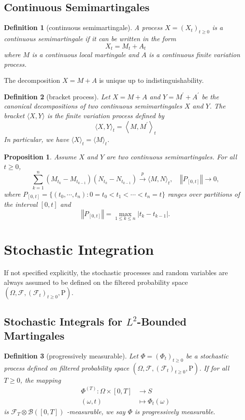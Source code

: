 \documentclass{article}
\newtheorem{definition}{Definition}[section]
\newtheorem{proposition}{Proposition}[section]
\theoremstyle{nonumberplain}
\begin{document}
\subsection{Continuous Semimartingales}
\begin{definition}[continuous semimartingale]
A process $X=\left(X_{t}\right)_{t \geq 0}$ is a continuous semimartingale if it can be written in the form
\[
X_{t}=M_{t}+A_{t}
\]
where $M$ is a continuous local martingale and $A$ is a continuous finite variation process.
\end{definition}
The decomposition $X=M+A$ is unique up to indistinguishability.

\begin{definition}[bracket process]
Let $X=M+A$ and $Y=M^{\prime}+A^{\prime}$ be the canonical decompositions of two continuous semimartingales $X$ and $Y$. The bracket $\langle X, Y\rangle$ is the finite variation process defined by
\[
\langle X, Y\rangle_{t}=\left\langle M, M^{\prime}\right\rangle_{t}
\]
In particular, we have $\langle X\rangle_{t}=\langle M\rangle_{t}$.
\end{definition}

\begin{proposition}
	Assume $X$ and $Y$ are two continuous semimartingales. For all $t\ge0$,
	\[
	\sum_{k=1}^{n}\left(M_{t_{k}}-M_{t_{k-1}}\right)\left(N_{t_{k}}-N_{t_{k-1}}\right)\stackrel{p}{\longrightarrow}\langle M, N\rangle_{t},\quad\left\Vert P_{[0,t]}\right\Vert \longrightarrow 0,
	\]
	where $P_{[0,t]}=\{(t_0,\cdots,t_n):0=t_0<t_1<\cdots<t_n=t\}$ ranges over partitions of the interval $[0,t]$ and 
	\[
	\left\Vert P_{[0,t]}\right\Vert=\max\limits_{1\le k\le n}{|t_k-t_{k-1}|}.
	\]
\end{proposition}

\section{Stochastic Integration}
If not specified explicitly, the stochastic processes and random variables are always assumed to be defined on the filtered probability space $(\Omega,\mathcal{F},(\mathcal{F}_{t})_{t\ge0},\mathrm{P})$.
\subsection{Stochastic Integrals for $L^2$-Bounded Martingales}
\begin{definition}[progressively measurable]
	Let $\Phi=(\Phi_t)_{t\ge0}$ be a stochastic process defined on filtered probability space $(\Omega,\mathcal{F},(\mathcal{F}_{t})_{t\ge0},\mathrm{P})$. If for all $T\ge0$, the mapping
	\begin{align*}
	\Phi^{(T)}: \Omega \times [0, T]&\longrightarrow S\\
	(\omega,t)&\longmapsto \Phi_t(\omega)
	\end{align*}
	is $\mathcal{F}_T\otimes \mathcal{B}([0,T])$ -measurable, we say $\Phi$ is \emph{progressively measurable}.
\end{definition}
\end{document}
